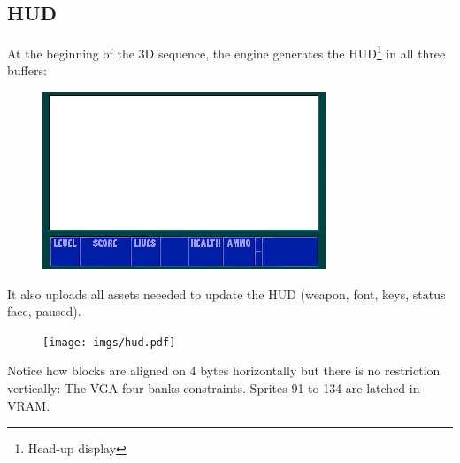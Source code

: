 \subsection{HUD}
At the beginning of the 3D sequence, the engine generates the HUD\footnote{Head-up display} in all three buffers:\\
\begin{figure}[H]
  \centering
 \includegraphics[width=\textwidth]{imgs/hud_empty.png}
\end{figure}
It also uploads all assets neeeded to update the HUD (weapon, font, keys, status face, paused).
\begin{figure}[H]
  \centering
 \texttt{[image: imgs/hud.pdf]}
\end{figure}
Notice how blocks are aligned on 4 bytes horizontally but there is no restriction vertically: The VGA four banks constraints.
Sprites 91 to 134 are latched in VRAM.\\


